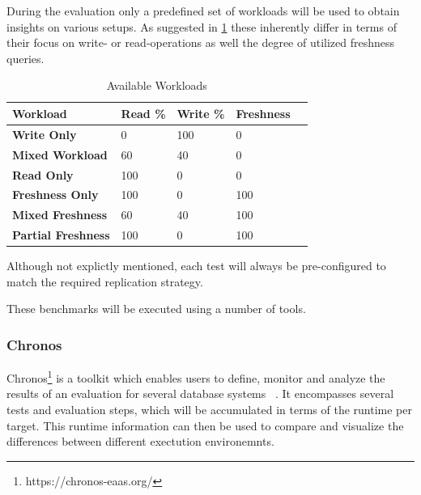 During the evaluation only a predefined set of workloads will be used to obtain insights on various setups.
As suggested in \ref{tab:workload table} these inherently differ in terms of their focus on write- or read-operations as well the
degree of utilized freshness queries. 

\begin{table}[h]
    \centering
    \begin{tabular}{|l|l|l|l|l|}
    \hline
    \textbf{Workload}        & \textbf{Read \%} & \textbf{Write \%} & \textbf{Freshness}  \\ \hline
    \textbf{Write Only}      & 0                & 100               & 0                             \\ \hline
    \textbf{Mixed Workload}  & 60               & 40                & 0                             \\ \hline
    \textbf{Read Only}       & 100              & 0                 & 0                             \\ \hline
    \textbf{Freshness Only} & 100              & 0                 & 100                           \\ \hline
    \textbf{Mixed Freshness} & 60              & 40                 & 100                           \\ \hline
    \textbf{Partial Freshness} & 100              & 0                 & 100                           \\ \hline
    \end{tabular}
    \caption{Available Workloads}
    \label{tab:workload table}
\end{table}

Although not explictly mentioned, each test will always be pre-configured to match the required replication strategy.  

These benchmarks will be executed using a number of tools.

\subsubsection{Chronos}

Chronos\footnote{https://chronos-eaas.org/} is a toolkit which enables users to define, 
monitor and analyze the results of an evaluation for several database systems ~\cite{vogt_chronos_2020}.
It encompasses several tests and evaluation steps, which will be accumulated in terms of the runtime 
per target. This runtime information can then be used to compare and visualize the differences between different exectution environemnts.  



